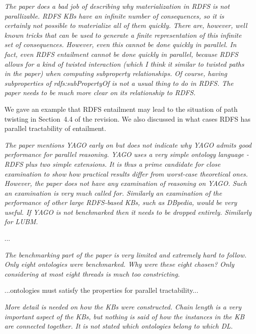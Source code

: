 \documentclass{article}
\let\quoteOld\quote
\let\endquoteOld\endquote
\renewenvironment{quote}{\quoteOld\itshape}{\endquoteOld}
\begin{document}
\begin{quote}
The paper does a bad job of describing why materialization in RDFS is not
parallizable.  RDFS KBs have an infinite number of consequences, so it is
certainly not possible to materialize all of them quickly.  There are,
however, well known tricks that can be used to generate a finite
representation of this infinite set of consequences.  However, even this
cannot be done quickly in parallel.  In fact, even RDFS entailment cannot be
done quickly in parallel, because RDFS allows for a kind of twisted
interaction (which I think it similar to twisted paths in the paper) when
computing subproperty relationships.  Of course, having subproperties of
rdfs:subPropertyOf is not a usual thing to do in RDFS.  The paper needs to
be much more clear on its relationship to RDFS.
\end{quote}

We gave an example that RDFS entailment may lead to the situation of path twisting in Section~4.4 of the revision.
We also discussed in what cases RDFS has parallel tractability of entailment.

\begin{quote}
The paper mentions YAGO early on but does not indicate why YAGO admits good
performance for parallel reasoning.  YAGO uses a very simple ontology
language - RDFS plus two simple extensions.  It is thus a prime candidate
for close examination to show how practical results differ from worst-case
theoretical ones.  However, the paper does not have any examination of
reasoning on YAGO.  Such an examination is very much called for.  Similarly
an examination of the performance of other large RDFS-based KBs, such as
DBpedia, would be very useful.   If YAGO is not benchmarked then it needs to
be dropped entirely.   Similarly for LUBM.
\end{quote}

...

\begin{quote}
The benchmarking part of the paper is very limited and extremely hard to
follow.    Only eight ontologies were benchmarked.  Why were these eight
chosen?  Only considering at most eight threads is much too constricting.
\end{quote}

...ontologies must satisfy the properties for parallel tractability...

\begin{quote}
More detail is needed on how the KBs were constructed.  Chain length is a
very important aspect of the KBs, but nothing is said of how the instances
in the KB are connected together.  It is not stated which ontologies belong
to which DL.
\end{quote}
\end{document}

